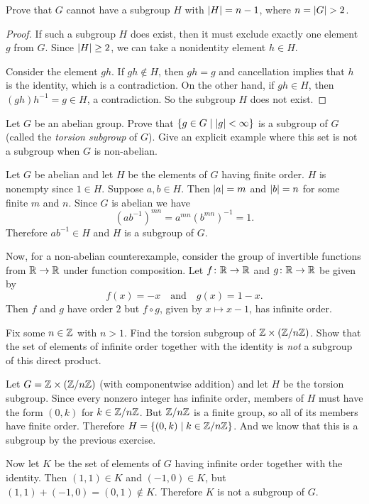 Prove that $G$ cannot have a subgroup $H$ with
$\lvert{H}\rvert = n - 1$, where $n = \lvert{G}\rvert > 2$.
\begin{proof}
  If such a subgroup $H$ does exist, then it must exclude exactly one
  element $g$ from $G$. Since $\lvert{H}\rvert\geq2$, we can take a nonidentity
  element $h\in H$.

  Consider the element $gh$. If $gh\not\in H$, then $gh = g$ and
  cancellation implies that $h$ is the identity, which is a
  contradiction. On the other hand, if $gh\in H$, then
  $(gh)h^{-1} = g\in H$, a contradiction. So the subgroup $H$ does not
  exist.
\end{proof}

 Let $G$ be an abelian group. Prove that
$\{g\in G\mid\lvert{g}\rvert<\infty\}$ is a subgroup of $G$ (called the {\em
  torsion subgroup} of $G$). Give an explicit example where this set
is not a subgroup when $G$ is non-abelian.
\begin{solution}
  Let $G$ be abelian and let $H$ be the elements of $G$ having finite
  order. $H$ is nonempty since $1\in H$. Suppose $a,b\in H$. Then
  $\lvert{a}\rvert = m$ and $\lvert{b}\rvert = n$ for some finite $m$ and $n$. Since
  $G$ is abelian we have
  \begin{equation*}
    (ab^{-1})^{mn} = a^{mn}(b^{mn})^{-1} = 1.
  \end{equation*}
  Therefore $ab^{-1}\in H$ and $H$ is a subgroup of $G$.

  Now, for a non-abelian counterexample, consider the group of
  invertible functions from $\mathbb{R}\to\mathbb{R}$ under function composition. Let
  $f\colon\mathbb{R}\to\mathbb{R}$ and $g\colon\mathbb{R}\to\mathbb{R}$ be given by
  \begin{equation*}
    f(x) = -x
    \quad\text{and}\quad
    g(x) = 1 - x.
  \end{equation*}
  Then $f$ and $g$ have order $2$ but $f\circ g$, given by
  $x\mapsto x - 1$, has infinite order.
\end{solution}

 Fix some $n\in\mathbb{Z}$ with $n > 1$. Find the torsion subgroup
of $\mathbb{Z}\times(\mathbb{Z}/n\mathbb{Z})$. Show that the set of elements of infinite order
together with the identity is {\em not} a subgroup of this direct
product.
\begin{solution}
  Let $G = \mathbb{Z}\times(\mathbb{Z}/n\mathbb{Z})$ (with componentwise addition) and let $H$
  be the torsion subgroup. Since every nonzero integer has infinite
  order, members of $H$ must have the form $(0, k)$ for
  $k\in\mathbb{Z}/n\mathbb{Z}$. But $\mathbb{Z}/n\mathbb{Z}$ is a finite group, so all of its members
  have finite order. Therefore $H = \{ (0, k) \mid k\in\mathbb{Z}/n\mathbb{Z} \}$. And
  we know that this is a subgroup by the previous exercise.

  Now let $K$ be the set of elements of $G$ having infinite order
  together with the identity. Then $(1, 1)\in K$ and $(-1, 0)\in K$,
  but $(1,1) + (-1,0) = (0, 1)\not\in K$. Therefore $K$ is not a
  subgroup of $G$.
\end{solution}


